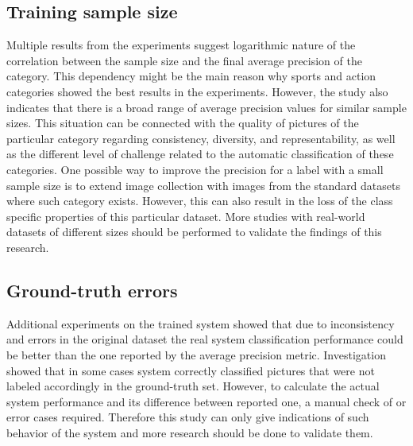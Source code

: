 \subsection{Training sample size}
Multiple results from the experiments suggest logarithmic nature of the correlation between the sample size and the final average precision of the category. This dependency might be the main reason why sports and action categories showed the best results in the experiments. However, the study also indicates that there is a broad range of average precision values for similar sample sizes. This situation can be connected with the quality of pictures of the particular category regarding consistency, diversity, and representability, as well as the different level of challenge related to the automatic classification of these categories. One possible way to improve the precision for a label with a small sample size is to extend image collection with images from the standard datasets where such category exists. However, this can also result in the loss of the class specific properties of this particular dataset. More studies with real-world datasets of different sizes should be performed to validate the findings of this research.


\subsection{Ground-truth errors}
Additional experiments on the trained system showed that due to inconsistency and errors in the original dataset the real system classification performance could be better than the one reported by the average precision metric. Investigation showed that in some cases system correctly classified pictures that were not labeled accordingly in the ground-truth set. However, to calculate the actual system performance and its difference between reported one, a manual check of or error cases required. Therefore this study can only give indications of such behavior of the system and more research should be done to validate them.


